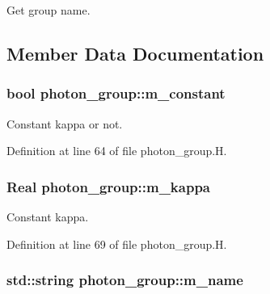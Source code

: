 Get group name. 



\subsection{Member Data Documentation}
\subsubsection[{\texorpdfstring{m\+\_\+constant}{m_constant}}]{\setlength{\rightskip}{0pt plus 5cm}bool photon\+\_\+group\+::m\+\_\+constant\hspace{0.3cm}{\ttfamily [protected]}}\hypertarget{classphoton__group_a671607459a709e082f5913d6ace92384}{}\label{classphoton__group_a671607459a709e082f5913d6ace92384}


Constant kappa or not. 



Definition at line 64 of file photon\+\_\+group.\+H.

\subsubsection[{\texorpdfstring{m\+\_\+kappa}{m_kappa}}]{\setlength{\rightskip}{0pt plus 5cm}Real photon\+\_\+group\+::m\+\_\+kappa\hspace{0.3cm}{\ttfamily [protected]}}\hypertarget{classphoton__group_a9f2d99f8fc5625d176ef5e85c54faac2}{}\label{classphoton__group_a9f2d99f8fc5625d176ef5e85c54faac2}


Constant kappa. 



Definition at line 69 of file photon\+\_\+group.\+H.

\subsubsection[{\texorpdfstring{m\+\_\+name}{m_name}}]{\setlength{\rightskip}{0pt plus 5cm}std\+::string photon\+\_\+group\+::m\+\_\+name\hspace{0.3cm}{\ttfamily [protected]}}\hypertarget{classphoton__group_ad86e5d4576634fbba61331f252a5d9d9}{}\label{classphoton__group_ad86e5d4576634fbba61331f252a5d9d9}


